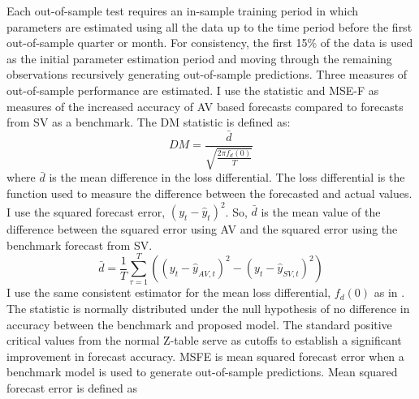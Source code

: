 Each out-of-sample test requires an in-sample training period in which parameters are estimated using all the data up to the time period before the first out-of-sample quarter or month. For consistency, the first 15\% of the data is used as the initial parameter estimation period and  moving through the remaining  observations recursively generating out-of-sample predictions. Three measures of out-of-sample performance are estimated.
I use the \citet{Diebold1995} statistic and \citet{mccracken_asymptotics_2007} MSE-F as measures of the increased accuracy of AV based forecasts compared to forecasts from SV as a benchmark. The DM statistic is defined as:
\begin{equation}
	DM = \frac{\bar{d}}{\sqrt{\frac{2\pi f_{d}(0)}{T}}}
\end{equation}
where $\bar{d}$ is the mean difference in the loss differential. The loss differential is the function used to measure the difference between the forecasted and actual values. I use the squared forecast error, $(y_{t} - \hat{y}_{t})^{2}$. So, $\bar{d}$ is the mean value of the difference between the squared error using AV and the squared error using the benchmark forecast from SV.
\begin{equation}
	\bar{d} = \frac{1}{T}\sum^{T}_{\tau=1}((y_{t} - \hat{y}_{AV,t})^{2} - (y_{t} - \hat{y}_{SV,t})^{2})
\end{equation}
I use the same consistent estimator for the mean loss differential, $f_{d}(0)$ as in \citet{Diebold1995}. The statistic is normally distributed under the null hypothesis of no difference in accuracy between the benchmark and proposed model. The standard positive critical values from the normal Z-table serve as cutoffs to establish a significant improvement in forecast accuracy. MSFE is mean squared forecast error when a benchmark model is used to generate out-of-sample predictions. Mean squared forecast error is defined as
